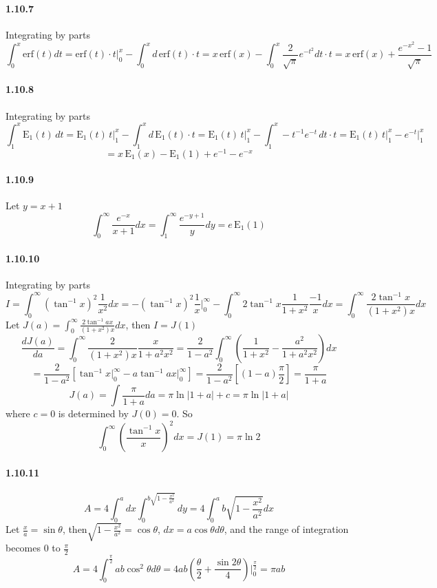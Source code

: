\documentclass[a4paper]{article}
\begin{document}
\paragraph{1.10.7}
Integrating by parts
\[\int_0^x \mathrm{erf}(t)dt=\mathrm{erf}(t)\cdot t\Big|_0^x-\int_0^x d\,\mathrm{erf}(t)\cdot t=x\,\mathrm{erf}(x)-\int_0^x\frac{2}{\sqrt{\pi}}e^{-t^2}dt\cdot t=x\,\mathrm{erf}(x)+\frac{e^{-x^2}-1}{\sqrt{\pi}}\]

\paragraph{1.10.8}
Integrating by parts
\[\int_1^x\mathrm{E_1}(t)\,dt=\mathrm{E_1}(t)\,t\Big|_1^x-\int_1^x d\,\mathrm{E_1}(t)\cdot t=\mathrm{E_1}(t)\,t\Big|_1^x-\int_1^x -t^{-1}e^{-t}\,dt\cdot t=\mathrm{E_1}(t)\,t\Big|_1^x-e^{-t}\Big|_1^x\]
\[=x\,\mathrm{E_1}(x)-\mathrm{E_1}(1)+e^{-1}-e^{-x} \]

\paragraph{1.10.9}
Let $y=x+1$
\[\int_0^\infty\frac{e^{-x}}{x+1}dx=\int_1^\infty\frac{e^{-y+1}}{y}dy=e\,\mathrm{E_1}(1) \]

\paragraph{1.10.10}
Integrating by parts
\[I=\int_0^\infty(\tan^{-1}x)^2\frac{1}{x^2}dx=-(\tan^{-1}x)^2\frac{1}{x}\Big|_0^\infty-\int_0^\infty2\tan^{-1}x\frac{1}{1+x^2}\frac{-1}{x}dx=\int_0^\infty\frac{2\tan^{-1}x}{(1+x^2)x}dx\]
Let $J(a)=\int_0^\infty\frac{2\tan^{-1}ax}{(1+x^2)x}dx$, then $I=J(1)$
\[\frac{dJ(a)}{da}=\int_0^\infty\frac{2}{(1+x^2)x}\frac{x}{1+a^2x^2}=\frac{2}{1-a^2}\int_0^\infty\left(\frac{1}{1+x^2}-\frac{a^2}{1+a^2x^2} \right)dx\]
\[=\frac{2}{1-a^2}\left[\tan^{-1}x\Big|_0^\infty-a\tan^{-1}ax\Big|_0^\infty \right]=\frac{2}{1-a^2}\left[(1-a)\frac{\pi}{2} \right] =\frac{\pi}{1+a}\]
\[J(a)=\int\frac{\pi}{1+a}da=\pi\ln|1+a|+c=\pi\ln|1+a|\]
where $c=0$ is determined by $J(0)=0$. So 
\[\int_0^\infty\left(\frac{\tan^{-1}x}{x} \right)^2dx=J(1)=\pi\ln2\]

\paragraph{1.10.11}
\[A=4\int_0^a dx\int_0^{b\sqrt{1-\frac{x^2}{a^2}}}dy=4\int_0^ab\sqrt{1-\frac{x^2}{a^2}}dx\]
Let $\frac{x}{a}=\sin{\theta}$, then$\sqrt{1-\frac{x^2}{a^2}}=\cos{\theta}$, $dx=a\cos{\theta}d\theta$, and the range of integration becomes $0$ to $\frac{\pi}{2}$
\[A=4\int_0^\frac{\pi}{2}ab\cos^2\theta d\theta=4ab\left(\frac{\theta}{2}+\frac{\sin{2\theta}}{4} \right)\Big|_0^{\frac{\pi}{2}}=\pi ab\]
\end{document}

